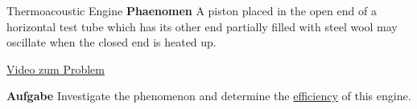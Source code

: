 \documentclass[9pt]{beamer}
\begin{document}
\begin{frame}{Thermoacoustic Engine}
\textbf{Phaenomen} A piston placed in the open end of a horizontal test tube which has its other end partially filled with steel wool may oscillate when the closed end is heated up.
\vfill
\begin{center}
\color{blue}\href{https://www.youtube.com/watch?v=ErlvMZI0tlA}{Video zum Problem}\color{black}
\end{center}
\vfill
\textbf{Aufgabe} Investigate the phenomenon and determine the \underline{efficiency} of this engine.
\end{frame}
\end{document}
